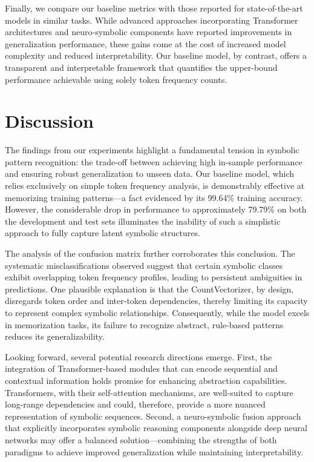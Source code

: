 \documentclass{article}
\begin{document}
Finally, we compare our baseline metrics with those reported for state-of-the-art models in similar tasks. While advanced approaches incorporating Transformer architectures and neuro-symbolic components have reported improvements in generalization performance, these gains come at the cost of increased model complexity and reduced interpretability. Our baseline model, by contrast, offers a transparent and interpretable framework that quantifies the upper-bound performance achievable using solely token frequency counts.

\section{Discussion}
The findings from our experiments highlight a fundamental tension in symbolic pattern recognition: the trade-off between achieving high in-sample performance and ensuring robust generalization to unseen data. Our baseline model, which relies exclusively on simple token frequency analysis, is demonstrably effective at memorizing training patterns—a fact evidenced by its 99.64\% training accuracy. However, the considerable drop in performance to approximately 79.79\% on both the development and test sets illuminates the inability of such a simplistic approach to fully capture latent symbolic structures.

The analysis of the confusion matrix further corroborates this conclusion. The systematic misclassifications observed suggest that certain symbolic classes exhibit overlapping token frequency profiles, leading to persistent ambiguities in predictions. One plausible explanation is that the CountVectorizer, by design, disregards token order and inter-token dependencies, thereby limiting its capacity to represent complex symbolic relationships. Consequently, while the model excels in memorization tasks, its failure to recognize abstract, rule-based patterns reduces its generalizability.

Looking forward, several potential research directions emerge. First, the integration of Transformer-based modules that can encode sequential and contextual information holds promise for enhancing abstraction capabilities. Transformers, with their self-attention mechanisms, are well-suited to capture long-range dependencies and could, therefore, provide a more nuanced representation of symbolic sequences. Second, a neuro-symbolic fusion approach that explicitly incorporates symbolic reasoning components alongside deep neural networks may offer a balanced solution—combining the strengths of both paradigms to achieve improved generalization while maintaining interpretability.
\end{document}
